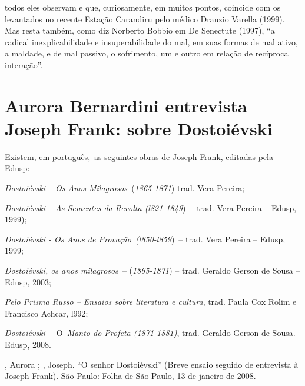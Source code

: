 todos eles observam e que, curiosamente, em muitos pontos, coincide com
os levantados no recente Estação Carandiru pelo médico Drauzio Varella
(1999). Mas resta também, como diz Norberto Bobbio em De Senectute
(1997), ``a radical inexplicabilidade e insuperabilidade do mal, em suas
formas de mal ativo, a maldade, e de mal passivo, o sofrimento, um e
outro em relação de recíproca interação''.

\chapter{Aurora Bernardini entrevista Joseph Frank: sobre Dostoiévski}

Existem, em português,~as seguintes obras de Joseph Frank, editadas pela
Edusp:~~

\emph{Dostoiévski -- Os Anos Milagrosos~}(\emph{1865-1871}) trad. Vera
Pereira;~

\emph{Dostoiévski -- As Sementes da Revolta (l821-1849})~-- trad. Vera
Pereira -- Edusp, 1999);

\emph{Dostoiévski - Os Anos de Provação~(l850-l859})~-- trad. Vera
Pereira -- Edusp, 1999;

\emph{Dostoiévski, os anos milagrosos}~-- (\emph{1865-1871}) -- trad.
Geraldo Gerson de Sousa -- Edusp, 2003;~

\emph{Pelo Prisma Russo -- Ensaios sobre literatura e cultura}, trad.
Paula Cox Rolim e Francisco Achcar, l992;\textbf{~}

\emph{Dostoiévski~}-- O~\emph{Manto do Profeta (1871-1881)}, trad.
Geraldo Gerson de Sousa. Edusp, 2008.

, Aurora ; , Joseph. ``O senhor Dostoiévski'' (Breve
ensaio seguido de entrevista à Joseph Frank). São Paulo: Folha de São
Paulo, 13 de janeiro de 2008.

